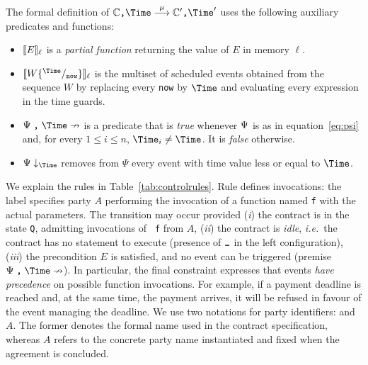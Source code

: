The formal definition of
$\contract {\comma} \Time \lred{\mu} \contract' {\comma} \Time'$ uses
the following auxiliary predicates and functions:
%
\begin{itemize}
\item $\llbracket E\rrbracket_{\ell}$ is a \emph{partial function} returning the
  value of $E$ in memory $\ell$.
\item $\sem{W\{^\Time/_{{\tt now}}\}}_\ell$ is the multiset of
  scheduled events obtained from the sequence $W$ by replacing every
  {\tt now} by $\Time$ and evaluating every expression in the time
  guards.
\item $\nored{\SemEvent}{\Time}$ is a predicate that is \emph{true}
  whenever $\Psi$ is as in equation~\eqref{eq:psi}
  and, for every $1 \leq i \leq n$, $\Time_i \neq \Time$. It is
  \emph{false} otherwise.
\item
$\SemEvent\downarrow_{\Time}$ removes from $\Psi$ every event with time value less or equal to $\Time$. 
\end{itemize}

We explain the rules in Table~\ref{tab:controlrules}.
%
Rule  defines invocations: the label specifies
party $A$ performing the invocation of a function named {\tt f} with
the actual parameters. The transition may occur provided (\emph{i})
the contract is in the state \texttt{Q}, admitting invocations of {\tt
  f} from $A$, (\emph{ii}) the contract is \emph{idle},
\emph{i.e.}~the contract has no statement to execute (presence of
$\zero$ in the left configuration), (\emph{iii}) the precondition $E$
is satisfied, and no event can be triggered (premise
$\nored{\SemEvent}{\Time}$). In particular, the final constraint
expresses that events \emph{have precedence} on possible function
invocations. For example, if a payment deadline is reached and, at the
same time, the payment arrives, it will be refused in favour of the
event managing the deadline.  We use two notations for party
identifiers: {\A} and $A$. The former denotes the formal name used in
the contract specification, whereas $A$ refers to the concrete party
name instantiated and fixed when the agreement is concluded.

